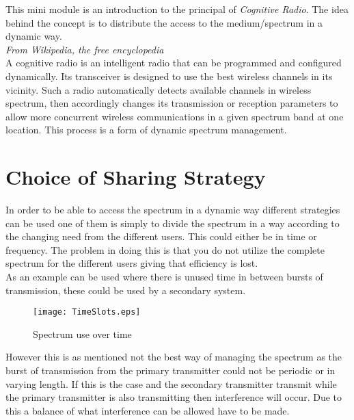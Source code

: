 This mini module is an introduction to the principal of \textit{Cognitive Radio}. The idea behind the concept is to distribute  the access to the medium/spectrum in a dynamic way. \\

\textit{From Wikipedia, the free encyclopedia}\\
A cognitive radio is an intelligent radio that can be programmed and configured dynamically. Its transceiver is designed to use the best wireless channels in its vicinity. Such a radio automatically detects available channels in wireless spectrum, then accordingly changes its transmission or reception parameters to allow more concurrent wireless communications in a given spectrum band at one location. This process is a form of dynamic spectrum management.

\section{Choice of Sharing Strategy}
In order to be able to access the spectrum in a dynamic way different strategies can be used one of them is simply to divide the spectrum in a way according to the changing need from the different users. This could either be in time or frequency. The problem in doing this is that you do not utilize the complete spectrum for the different users giving that efficiency is lost.\\

As an example can be used  where there is unused time in between bursts of transmission, these could be used by a secondary system.  
\begin{figure}[!h]
  \centering
  \texttt{[image: TimeSlots.eps]}
  \caption{Spectrum use over time}
  \label{fig:TimeSlots}
\end{figure}

However this is as mentioned not the best way of managing the spectrum as the burst of transmission from the primary transmitter could not be periodic or in varying length. If this is the case and the secondary transmitter transmit while the primary transmitter is also transmitting then interference will occur. Due to this a balance of what interference can be allowed have to be made. 